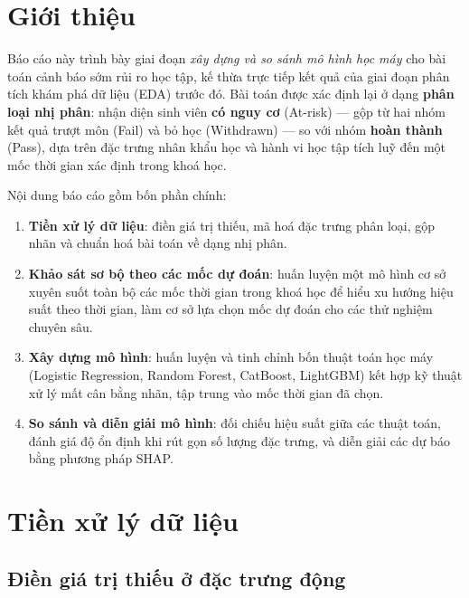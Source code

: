 \documentclass[a4paper]{article}
\begin{document}

\section{Giới thiệu}

Báo cáo này trình bày giai đoạn \textit{xây dựng và so sánh mô hình học máy}
cho bài toán cảnh báo sớm rủi ro học tập, kế thừa trực tiếp kết quả của giai
đoạn phân tích khám phá dữ liệu (EDA) trước đó. Bài toán được xác định lại ở
dạng \textbf{phân loại nhị phân}: nhận diện sinh viên \textbf{có nguy cơ}
(At-risk) --- gộp từ hai nhóm kết quả trượt môn (Fail) và bỏ học (Withdrawn)
--- so với nhóm \textbf{hoàn thành} (Pass), dựa trên đặc trưng nhân khẩu học và
hành vi học tập tích luỹ đến một mốc thời gian xác định trong khoá học.

Nội dung báo cáo gồm bốn phần chính:

\begin{enumerate}[leftmargin=*]
  \item \textbf{Tiền xử lý dữ liệu}: điền giá trị thiếu, mã hoá đặc trưng phân
        loại, gộp nhãn và chuẩn hoá bài toán về dạng nhị phân.
  \item \textbf{Khảo sát sơ bộ theo các mốc dự đoán}: huấn luyện một mô hình cơ
        sở xuyên suốt toàn bộ các mốc thời gian trong khoá học để hiểu xu hướng
        hiệu suất theo thời gian, làm cơ sở lựa chọn mốc dự đoán cho các thử
        nghiệm chuyên sâu.
  \item \textbf{Xây dựng mô hình}: huấn luyện và tinh chỉnh bốn thuật toán học
        máy (Logistic Regression, Random Forest, CatBoost, LightGBM) kết hợp kỹ
        thuật xử lý mất cân bằng nhãn, tập trung vào mốc thời gian đã chọn.
  \item \textbf{So sánh và diễn giải mô hình}: đối chiếu hiệu suất giữa các
        thuật toán, đánh giá độ ổn định khi rút gọn số lượng đặc trưng, và diễn
        giải các dự báo bằng phương pháp SHAP.
\end{enumerate}

\section{Tiền xử lý dữ liệu}

\subsection{Điền giá trị thiếu ở đặc trưng động}
\end{document}
